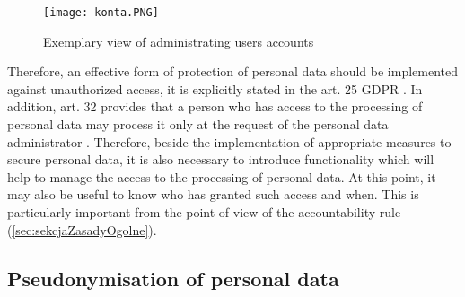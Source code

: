 \documentclass[en, noamssymb]{mgr}
\begin{document}
\begin{figure}[]
	\centering
	\texttt{[image: konta.PNG]}
	\caption[Exemplary view of administrating users accounts]{Exemplary view of administrating users accounts}
	\label{fig:accountsAdministration}
\end{figure}

Therefore, an effective form of protection of personal data should be implemented against unauthorized access, it is explicitly stated in the art. 25 GDPR \cite{rodo_art25}. In addition, art. 32 provides that a person who has access to the processing of personal data may process it only at the request of the personal data administrator \cite{rodo_art32}. Therefore, beside the implementation of appropriate measures to secure personal data, it is also necessary to introduce functionality which will help to manage the access to the processing of personal data. At this point, it may also be useful to know who has granted such access and when. This is particularly important from the point of view of the accountability rule (\ref{sec:sekcjaZasadyOgolne}). 




\subsection{Pseudonymisation of personal data}
\end{document}
